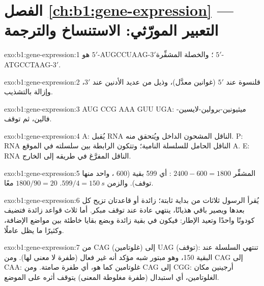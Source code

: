 \section*{الفصل \ref{ch:b1:gene-expression} --- التعبير المورّثي: الاستنساخ والترجمة}

\begin{solution}{exo:b1:gene-expression:1}
 هو $5'$-AUGCCUAAG-$3'$؛ والخصلة المشفِّرة $5'$-ATGCCTAAG-$3'$.
\end{solution}

\begin{solution}{exo:b1:gene-expression:2}
قلنسوة عند $5'$ (غوانين معدَّل)، وذيل من عديد الأدنين عند $3'$،
وإزالة  بالتشذيب.
\end{solution}

\begin{solution}{exo:b1:gene-expression:3}
AUG CCG AAA GUU UGA: ميثيونين-برولين-لايسين-فالين، ثم توقف.
\end{solution}

\begin{solution}{exo:b1:gene-expression:4}
A: يُقبل RNA الناقل المشحون الداخل ويُتحقق منه. P: RNA الناقل الحامل
للسلسلة النامية؛ وتتكون الرابطة بين سلسلته  في الموقع
A. E: RNA الناقل المفرَّغ في طريقه إلى الخارج.
\end{solution}

\begin{solution}{exo:b1:gene-expression:5}
المشفِّر $2400 - 600 = 1800$ : أي 599 بقية (600 ، واحد
منها توقف). والزمن $599/4 = \qty{150}{s}$.  $1800/90 = 20$ معًا.
\end{solution}

\begin{solution}{exo:b1:gene-expression:6}
يُقرأ الرسول ثلاثات من بداية ثابتة؛  زائدة أو قاعدتان تزيح كل
 بعدها ويصير باقي  هذيانًا، ينتهي عادة عند توقف مبكر.
أما ثلاث قواعد زائدة فتضيف كودونًا واحدًا وتعيد الإطار: فيكون في
 بقية زائدة وبضع بقايا خاطئة بين مواضع الإضافة، وكثيرًا ما
يظل عاملًا.
\end{solution}

\begin{solution}{exo:b1:gene-expression:7}
من CAG (غلوتامين) إلى UAG (توقف): تنتهي السلسلة عند البقية 150، وهو
 مبتور شبه مؤكد أنه غير فعال (طفرة لا معنى لها). ومن CAG إلى
CAA: غلوتامين كما هو، أي طفرة صامتة. ومن CAG إلى CGG: أرجينين مكان
الغلوتامين، أي استبدال (طفرة مغلوطة المعنى) يتوقف أثره على الموضع.
\end{solution}

